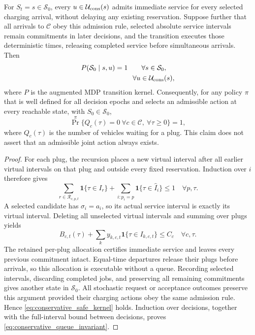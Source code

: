 \begin{proposition}
\label{prop:conservative_queue_safety}
For $S_t=s\in\mathcal S_0$, every
$u\in\mathcal U_{\rm cons}(s)$ admits immediate service for every
selected charging arrival, without delaying any existing reservation.
Suppose further that all arrivals to $\mathcal C$ obey this admission
rule, selected absolute service intervals remain commitments in later
decisions, and the transition executes those deterministic times,
releasing completed service before simultaneous arrivals. Then
\begin{equation}
\begin{aligned}
P(\mathcal S_0\mid s,u)&=1\qquad\forall s\in\mathcal S_0,\\
&\hspace{9mm}\forall u\in\mathcal U_{\rm cons}(s),
\end{aligned}
\label{eq:conservative_safe_kernel}
\end{equation}
where $P$ is the augmented MDP transition kernel. Consequently, for
any policy $\pi$ that is well defined for all decision epochs and
selects an admissible action at every reachable state, with
$S_0\in\mathcal S_0$,
\begin{equation}
\Pr^\pi\{Q_c(\tau)=0\ \forall c\in\mathcal C,
                              \ \forall\tau\ge0\}=1,
\label{eq:conservative_queue_invariant}
\end{equation}
where $Q_c(\tau)$ is the number of vehicles waiting for a plug.
This claim does not assert that an admissible joint action always exists.
\end{proposition}
\begin{proof}
For each plug, the recursion places a new virtual interval after all
earlier virtual intervals on that plug and outside every fixed
reservation. Induction over $i$ therefore gives
\begin{equation}
\sum_{r\in\mathcal R_{c,p,t}}\mathbf1\{\tau\in I_r\}
+\sum_{i:p_i=p}\mathbf1\{\tau\in\widehat I_i\}\le1
\quad\forall p,\tau.
\label{eq:conservative_plug_bound}
\end{equation}
A selected candidate has $\sigma_i=a_i$, so its actual service
interval is exactly its virtual interval. Deleting all unselected
virtual intervals and summing over plugs yields
\begin{equation}
B_{c,t}(\tau)+\sum_k y_{k,c,t}
\mathbf1\{\tau\in I_{k,c,t}\}\le C_c
\quad\forall c,\tau.
\label{eq:conservative_occupancy_bound}
\end{equation}
The retained per-plug allocation certifies immediate service and leaves
every previous commitment intact. Equal-time departures release their
plugs before arrivals, so this allocation is executable without a queue.
Recording selected intervals, discarding completed jobs, and preserving
all remaining commitments gives another state in $\mathcal S_0$.
All stochastic request or acceptance outcomes preserve this argument
provided their charging actions obey the same admission rule. Hence
\eqref{eq:conservative_safe_kernel} holds. Induction over decisions,
together with the full-interval bound between decisions, proves
\eqref{eq:conservative_queue_invariant}.
\end{proof}

